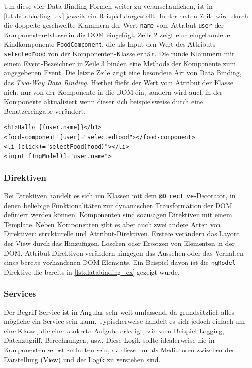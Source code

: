 Um diese vier Data Binding Formen weiter zu veranschaulichen, ist in \cref{lst:databinding_ex} jeweils ein Beispiel dargestellt. In der ersten Zeile wird durch die doppelte geschweifte Klammern der Wert \texttt{name} vom Attribut \texttt{user} der Komponenten-Klasse in die \acs{DOM} eingefügt. Zeile 2 zeigt eine eingebundene Kindkomponente \texttt{FoodComponent}, die als Input den Wert des Attributs \texttt{selectedFood} von der Komponenten-Klasse erhält. Die runde Klammern mit einem Event-Bezeichner in Zeile 3 binden eine Methode der Komponente zum angegebenen Event. Die letzte Zeile zeigt eine besondere Art von Data Binding, das \textit{Two-Way Data Binding}. Hierbei fließt der Wert vom Attribut der Klasse nicht nur von der Komponente in die \acs{DOM} ein, sondern wird auch in der Komponente aktualisiert wenn dieser sich beispielsweise durch eine Benutzereingabe verändert.
\\
\begin{lstlisting}[language=HTML5,caption={Beispiele zu den Data Binding Arten},label=lst:databinding_ex]
<h1>Hallo {{user.name}}</h1>
<food-component [user]="selectedFood"></food-component>
<li (click)="selectFood(food)"></li>
<input [(ngModel)]="user.name">
\end{lstlisting}

\subsubsection{Direktiven}
Bei Direktiven handelt es sich um Klassen mit dem \texttt{@Directive}-Decorator, in denen beliebige Funktionalitäten zur dynamischen Transformation der DOM definiert werden können. Komponenten sind sozusagen Direktiven mit einem Template. Neben Komponenten gibt es aber auch zwei andere Arten von Direktiven: strukturelle und Attribut-Direktiven. Erstere verändern das Layout der View durch das Hinzufügen, Löschen oder Ersetzen von Elementen in der \acs{DOM}. Attribut-Direktiven verändern hingegen das Aussehen oder das Verhalten eines bereits vorhandenen DOM-Elements. Ein Beispiel davon ist die \texttt{ngModel}-Direktive die bereits in \cref{lst:databinding_ex} gezeigt wurde.

\subsubsection{Services}
Der Begriff Service ist in Angular sehr weit umfassend, da grundsätzlich alles mögliche ein Service sein kann. Typischerweise handelt es sich jedoch einfach um eine Klasse, die eine konkrete Aufgabe erledigt, wie zum Beispiel Logging, Datenzugriff, Berechnungen, usw. Diese Logik sollte idealerweise nie in Komponenten selbst enthalten sein, da diese nur als Mediatoren zwischen der Darstellung (View) und der Logik zu verstehen sind.

